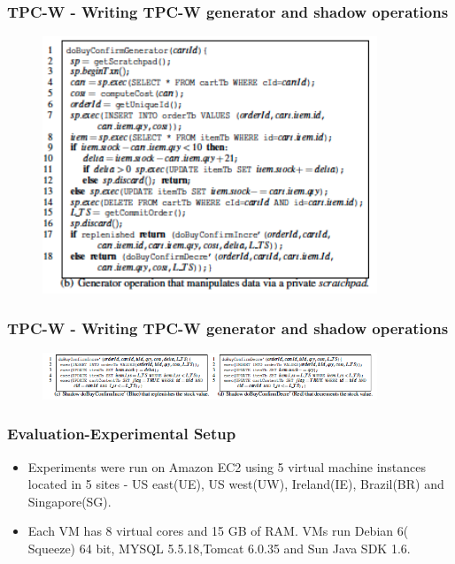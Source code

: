 \documentclass{beamer}
\begin{document}

\begin{frame}
\frametitle{TPC-W - Writing TPC-W generator and shadow operations}
\begin{figure}[t]
\includegraphics[width=10cm]{pic12.jpg}
\centering
\end{figure}
\end{frame}


\begin{frame}
\frametitle{TPC-W - Writing TPC-W generator and shadow operations}
\begin{figure}[t]
\includegraphics[width=10cm]{pic13.jpg}
\centering
\end{figure}
\end{frame}



\begin{frame}
\frametitle{Evaluation-Experimental Setup}
\begin{itemize}
\item Experiments were run on Amazon EC2 using 5 virtual machine instances located in 5 sites - US east(UE), US west(UW), Ireland(IE), Brazil(BR) and Singapore(SG).
\item Each VM has 8 virtual cores and 15 GB of RAM. VMs run Debian 6( Squeeze) 64 bit, MYSQL 5.5.18,Tomcat 6.0.35 and Sun Java SDK 1.6.
\end{itemize}
\end{frame}
\end{document}

